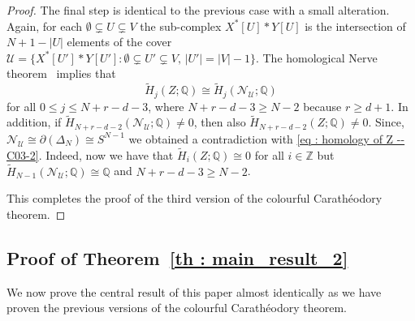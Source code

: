\documentclass[a4paper,11pt,reqno, english]{amsart}
\theoremstyle{definition}
\theoremstyle{remark}
\newcommand\Z{\mathbb Z}
\newcommand\Q{\mathbb Q}
\newcommand\NN{\mathscr N}
\newcommand\U{\mathscr U}
\begin{document}
\begin{proof}
	\medskip
	The final step is identical to the previous case with a small alteration.
	Again, for each  $\emptyset \subsetneq  U \subsetneq  V$ the sub-complex $X^*[U]*Y[U]$ is the intersection of $N+1-|U|$ elements of the cover $\U=\{X^*[U']*Y[U'] : \emptyset\subsetneq U' \subsetneq V,\, |U'|=|V|-1\}$.
	The homological Nerve theorem~\cite[Thm.\,2.1]{Meshulam2001} implies that
	\[
		\widetilde{H}_{j}(Z;\Q)\cong \widetilde{H}_{j}(\NN_{\U};\Q)
	\]
	for all $0\leq j\leq N+r-d-3$, where $N+r-d-3\geq N-2$ because $r\geq d+1$.
	In addition, if $\widetilde{H}_{N+r-d-2}(\NN_{\U};\Q)\neq 0$, then also $\widetilde{H}_{N+r-d-2}(Z;\Q)\neq 0$.
	Since, $\NN_{\U}\cong\partial ( \Delta_{N})\cong S^{N-1}$ we obtained a contradiction with \eqref{eq : homology of Z -- C03-2}.
	Indeed, now we have that $\widetilde{H}_{i}(Z;\Q)\cong 0$ for all $i\in \Z$ but $\widetilde{H}_{N-1}(\NN_{\U};\Q)\cong \Q$ and $N+r-d-3\geq N-2$.


	\medskip
	This completes the proof of the third version of the colourful Carath\'eodory theorem.
\end{proof}


\medskip
\subsection{Proof of Theorem~\ref{th : main_result_2}}\label{sec:proof_ main_result_2}
We now prove the central result of this paper almost identically as we have proven the previous versions of the colourful Carath\'eodory theorem.
\end{document}
